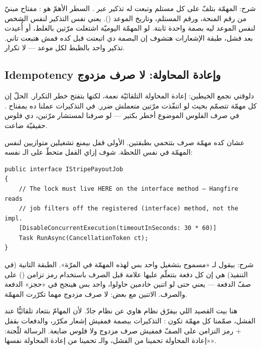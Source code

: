 شرح: المهمّة بتلفّ على كل مستلم وتبعت له تذكير عبر . السطر الأهمّ هو
: مفتاح مبنيّ من رقم المنحة، ورقم المستلم، وتاريخ الموعد
(). يعني نفس التذكير لنفس الشخص لنفس الموعد ليه بصمة واحدة ثابتة. لو
المهمّة اليوميّة اشتغلت مرّتين بالغلط، أو أُعيدت بعد فشل، طبقة الإشعارات هتشوف إن البصمة دي
اتبعتت قبل كده فمش هتبعت تاني. تذكير واحد بالظبط لكل موعد — لا تكرار.

\subsection{Idempotency وإعادة المحاولة: لا صرف مزدوج}

دلوقتي نجمع الخيطين: إعادة المحاولة التلقائيّة نعمة، لكنها بتفتح خطر التكرار. الحلّ إن كل
مهمّة تتصمّم بحيث لو اتنفّذت مرّتين متعملش ضرر. في التذكيرات عملنا ده بمفتاح
. في صرف الفلوس الموضوع أخطر بكتير — لو صرفنا لمستشار مرّتين، دي فلوس
حقيقيّة ضاعت.

عشان كده مهمّة صرف  بتتحمي بطبقتين. الأولى قفل بيمنع تشغيلين متوازيين لنفس
المهمّة في نفس اللحظة. شوف إزاي القفل متحطّ على الـ نفسه:

\begin{english}
\begin{lstlisting}[language={[Sharp]C}]
public interface IStripePayoutJob
{
    // The lock must live HERE on the interface method — Hangfire reads
    // job filters off the registered (interface) method, not the impl.
    [DisableConcurrentExecution(timeoutInSeconds: 30 * 60)]
    Task RunAsync(CancellationToken ct);
}
\end{lstlisting}
\end{english}

شرح:  بيقول لـ «مسموح بتشغيل واحد بس لهذه
المهمّة في المرّة». الطبقة التانية (في التنفيذ) هي إن كل دفعة بتتعلّم عليها علامة قبل الصرف
باستخدام رمز تزامن () على صفّ الدفعة — يعني حتى لو اتنين خادمين حاولوا، واحد
بس هينجح في «حجز» الدفعة والصرف. الاتنين مع بعض: لا صرف مزدوج مهما تكرّرت المهمّة.

\begin{spotlight}[ركّز هنا لإبهار اللجنة: \en{idempotency} + إعادة المحاولة = صفر تكرار]
هنا بيت القصيد اللي بيفرّق نظام هاوي عن نظام جادّ. لأن المهامّ بتتعاد تلقائيًّا عند الفشل،
صمّمنا كل مهمّة تكون : التذكيرات ببصمة  فمفيش إشعار
مكرّر، والدفعات بقفل  + رمز التزامن على الصفّ فمفيش صرف
مزدوج ولا فلوس ضايعة. الرسالة للّجنة: «إعادة المحاولة تحمينا من الفشل، والـ
تحمينا من إعادة المحاولة نفسها».
\end{spotlight}


